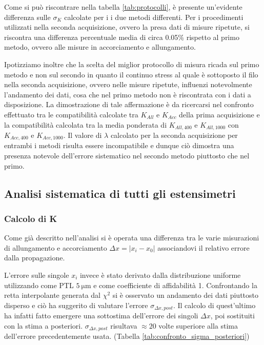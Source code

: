 \documentclass[a4paper,11pt,oneside]{article}
\begin{document}
Come si può riscontrare nella tabella \ref{tab:protocolli}, è presente un'evidente differenza sulle $\sigma_K$ calcolate per i i due metodi differenti. Per i procedimenti utilizzati nella seconda acquisizione, ovvero la presa dati di misure ripetute, si riscontra una differenza percentuale media di circa 0.05\%  rispetto al primo metodo, ovvero alle misure in accorciamento e allungamento. 

Ipotizziamo inoltre che la scelta del miglior protocollo di misura ricada sul primo metodo e non sul secondo in quanto il continuo stress al quale è sottoposto il filo nella seconda acquisizione, ovvero nelle misure ripetute, influenzi notevolmente l'andamento dei dati, cosa che nel primo metodo non è riscontrata con i dati a disposizione. La dimostrazione di tale affermazione è da ricercarsi nel confronto effettuato tra le compatibilità calcolate tra  $K_{All}$ e $K_{Acc}$ della prima acquisizione e la compatibilità calcolata tra la media ponderata di $K_{All, 400}$ e $K_{All, 1000}$ con $K_{Acc, 400}$ e $K_{Acc, 1000}$. Il valore di $\lambda$ calcolato per la seconda acquisizione per entrambi i metodi risulta essere incompatibile e dunque ciò dimostra una presenza notevole dell'errore sistematico nel secondo metodo piuttosto che nel primo.

\subsection{Analisi sistematica di tutti gli estensimetri}
\subsubsection*{Calcolo di K}
Come già descritto nell'analisi si è operata una differenza tra le varie misurazioni di allungamento e accorciamento $\Delta x= |x_i - x_0|$ associandovi il relativo errore dalla propagazione.

L'errore sulle singole $x_i$ invece è stato derivato dalla distribuzione uniforme utilizzando come PTL $\SI{5}{\micro\meter}$ e come coefficiente di affidabilità 1. Confrontando la retta interpolante generata dal $\chi^2$ si è osservato un andamento dei dati piuttosto disperso e ciò ha suggerito di valutare l'errore $\sigma_{\Delta x, post}$. Il calcolo di quest'ultimo ha infatti fatto emergere una sottostima dell'errore dei singoli $\Delta x$, poi sostituiti con la stima a posteriori. $\sigma_{\Delta x, post}$ risultava $\approx 20$ volte superiore alla stima dell'errore precedentemente usata. (Tabella \ref{tab:confronto_sigma_posteriori})
\end{document}
